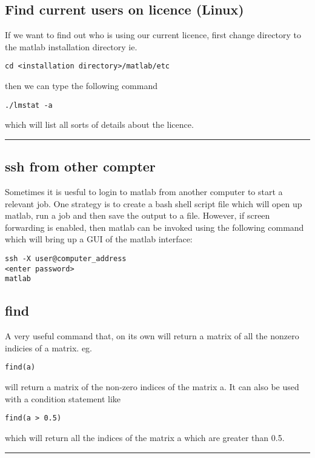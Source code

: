\documentclass[a4paper, 10pt]{article}
\newcommand{\mybotrule}{\vspace{4mm}\hrule}
\begin{document}
\subsection*{Find current users on licence (Linux)}
If we want to find out who is using our current licence, first change directory to the matlab installation directory ie.
\begin{Verbatim}[commandchars=\\\{\}]
cd <installation directory>/matlab/etc
\end{Verbatim}
then we can type the following command 
\begin{Verbatim}[commandchars=\\\{\}]
./lmstat -a
\end{Verbatim}
which will list all sorts of details about the licence. 
\mybotrule

\subsection*{ssh from other compter}
\label{sec:ssh-from-other}

Sometimes it is uesful to login to matlab from another computer to
start a relevant job. One strategy is to create a bash shell script
file which will open up matlab, run a job and then save the output to
a file. However, if screen forwarding is enabled, then matlab can be
invoked using the following command which will bring up a GUI of the
matlab interface:
\begin{verbatim}
ssh -X user@computer_address
<enter password>
matlab
\end{verbatim}


\subsection*{find}
A very useful command that, on its own will return a matrix of all the nonzero indicies of a matrix. eg. 
\begin{Verbatim}[commandchars=\\\{\}]
find(a)
\end{Verbatim}
will return a matrix of the non-zero indices of the matrix a. It can also be used with a condition statement like
\begin{Verbatim}[commandchars=\\\{\}]
find(a > 0.5)
\end{Verbatim}
which will return all the indices of the matrix a which are greater than 0.5.
\mybotrule
\end{document}
